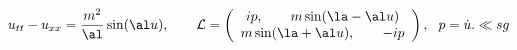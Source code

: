 \begin{equation}
u_{tt}- u_{xx} = \frac {m^2}{\al} \sin(\al u),\qquad 
  {\cal L} = \left( \begin{array}{c} ip , \qquad
  m  \sin (\la-\al u) \\
   m  \sin (\la+\al u),  \qquad -ip
    \end{array} \right), \ \ p= {\dot u}.
\ll{sg}\end{equation}

